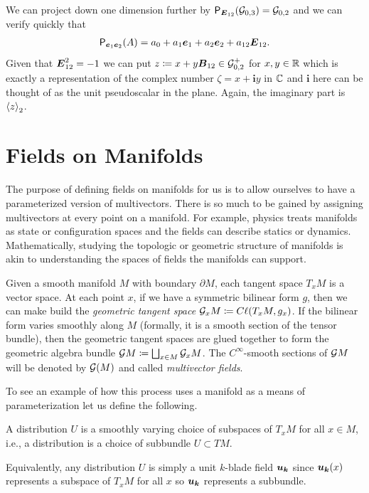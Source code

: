 \documentclass{article}
\begin{document}
We can project down one dimension further by $\projection_{\blade{E}_{12}} (\G_{0,3}) = \G_{0,2}$ and
we can verify quickly that
\begin{subequations}
\begin{align}
    \projection_{\blade{e}_1 \blade{e}_2}(A) =  a_0 + a_1 \blade{e}_1 + a_2 \blade{e}_2 + a_{12} \blade{E}_{12}.
\end{align}
\end{subequations}
Given that $\blade{E}_{12}^2=-1$ we can put $z \coloneqq x + y \blade{B}_{12} \in \G_{0,2}^+$ for $x,y\in \R$ which is exactly a representation of the complex number $\zeta = x+ \mathbf{i}y$ in $\C$ and $\mathbf{i}$ here can be thought of as the unit pseudoscalar in the plane. Again, the imaginary part is $\proj{2}{z}$.


\section{Fields on Manifolds}\label{sec:fields}

The purpose of defining fields on manifolds for us is to allow ourselves to have a parameterized version of multivectors. There is so much to be gained by assigning multivectors at every point on a manifold. For example, physics treats manifolds as state or configuration spaces and the fields can describe statics or dynamics. Mathematically, studying the topologic or geometric structure of manifolds is akin to understanding the spaces of fields the manifolds can support.

Given a smooth manifold $M$ with boundary $\partial M$, each tangent space $T_xM$ is a vector space. At each point $x$, if we have a symmetric bilinear form $g$, then we can make build the \emph{geometric tangent space} $\G_x M \coloneqq C\ell(T_xM,g_x)$. If the bilinear form varies smoothly along $M$ (formally, it is a smooth section of the tensor bundle), then the geometric tangent spaces are glued together to form the geometric algebra bundle $\G M\coloneqq \bigsqcup_{x\in M}\G_x M$. The $C^\infty$-smooth sections of $\G M$ will be denoted by $\G(M)$ and called \emph{multivector fields}. 

To see an example of how this process uses a manifold as a means of parameterization let us define the following.
\begin{definition}
A distribution $U$ is a smoothly varying choice of subspaces of $T_xM$ for all $x\in M$, i.e., a distribution is a choice of subbundle $U\subset TM$.
\end{definition}
Equivalently, any distribution $U$ is simply a unit $k$-blade field $\blade{u_k}$ since $\blade{u_k}(x)$ represents a subspace of $T_xM$ for all $x$ so $\blade{u_k}$ represents a subbundle.
\end{document}
